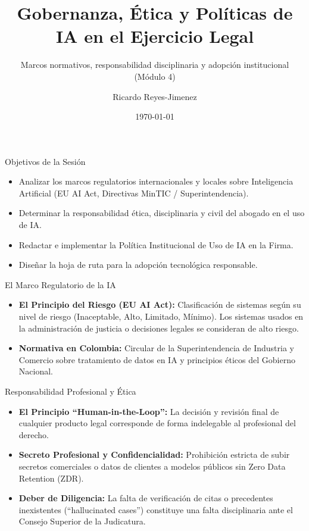 \documentclass[aspectratio=169]{beamer}
\title[ Gobernanza, Ética y Políticas]{ Gobernanza, Ética y Políticas de IA en el Ejercicio Legal}
\subtitle{ Marcos normativos, responsabilidad disciplinaria y adopción institucional (Módulo 4)}
\author{Ricardo Reyes-Jimenez}
\institute{Universidad de La Sabana}
\date{\today}
\begin{document}
\begin{frame}
  \titlepage
\end{frame}

\usebackgroundtemplate{}



\begin{frame}[fragile]{Objetivos de la Sesión}


\begin{itemize}
  \item Analizar los marcos regulatorios internacionales y locales sobre Inteligencia Artificial (EU AI Act, Directivas MinTIC / Superintendencia).
  \item Determinar la responsabilidad ética, disciplinaria y civil del abogado en el uso de IA.
  \item Redactar e implementar la Política Institucional de Uso de IA en la Firma.
  \item Diseñar la hoja de ruta para la adopción tecnológica responsable.
\end{itemize}
\end{frame}



\begin{frame}[fragile]{El Marco Regulatorio de la IA}


\begin{itemize}
  \item \textbf{El Principio del Riesgo (EU AI Act):} Clasificación de sistemas según su nivel de riesgo (Inaceptable, Alto, Limitado, Mínimo). Los sistemas usados en la administración de justicia o decisiones legales se consideran de alto riesgo.
  \item \textbf{Normativa en Colombia:} Circular de la Superintendencia de Industria y Comercio sobre tratamiento de datos en IA y principios éticos del Gobierno Nacional.
\end{itemize}
\end{frame}



\begin{frame}[fragile]{Responsabilidad Profesional y Ética}


\begin{itemize}
  \item \textbf{El Principio ``Human-in-the-Loop'':} La decisión y revisión final de cualquier producto legal corresponde de forma indelegable al profesional del derecho.
  \item \textbf{Secreto Profesional y Confidencialidad:} Prohibición estricta de subir secretos comerciales o datos de clientes a modelos públicos sin Zero Data Retention (ZDR).
  \item \textbf{Deber de Diligencia:} La falta de verificación de citas o precedentes inexistentes (``hallucinated cases'') constituye una falta disciplinaria ante el Consejo Superior de la Judicatura.
\end{itemize}
\end{frame}
\end{document}
